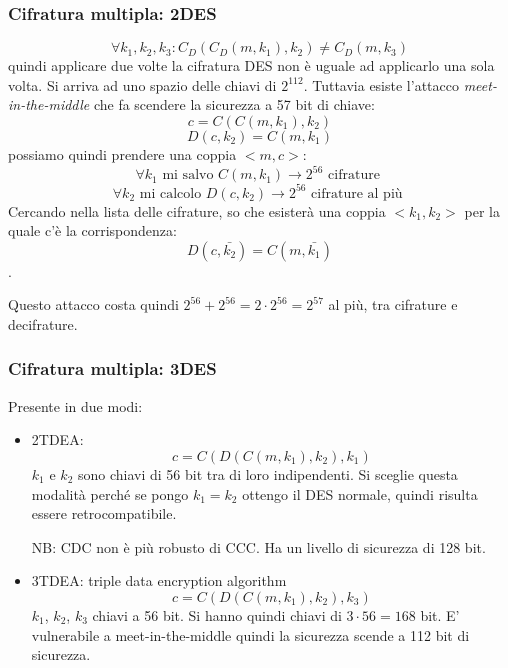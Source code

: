 \subsubsection{Cifratura multipla: 2DES}
$$ \forall k_1, k_2, k_3: C_D(C_D(m, k_1), k_2) \neq C_D(m, k_3) $$
quindi applicare due volte la cifratura DES non è uguale ad applicarlo una sola volta.
Si arriva ad uno spazio delle chiavi di $2^{112}$.
Tuttavia esiste l'attacco \emph{meet-in-the-middle} che fa scendere la sicurezza a 57 bit di chiave:
$$ c = C(C(m,k_1), k_2) $$
$$ D(c,k_2) = C(m,k_1) $$
possiamo quindi prendere una coppia $<m, c>$:
$$ \forall k_1 \text{ mi salvo } C(m, k_1) \xrightarrow{} 2^{56} \text{ cifrature }$$
$$ \forall k_2 \text{ mi calcolo } D(c, k_2) \xrightarrow{} 2^{56} \text{ cifrature al più }$$
Cercando nella lista delle cifrature, so che esisterà una coppia $<k_1, k_2>$ per la quale c'è la corrispondenza:
$$ D(c, \bar{k_2}) = C(m, \bar{k_1}) $$.

Questo attacco costa quindi $2^{56} + 2^{56} = 2 \cdot 2^{56} = 2^{57}$ al più, tra cifrature e decifrature.

\subsubsection{Cifratura multipla: 3DES}
Presente in due modi:
\begin{itemize}
    \item 2TDEA:
        $$ c = C(D(C(m, k_1), k_2), k_1) $$
        $k_1$ e $k_2$ sono chiavi di 56 bit tra di loro indipendenti. Si sceglie questa modalità perché se pongo $k_1 = k_2$ ottengo il DES normale, quindi risulta essere retrocompatibile.
        
        NB: CDC non è più robusto di CCC. Ha un livello di sicurezza di 128 bit.
    \item 3TDEA: triple data encryption algorithm
        $$ c = C(D(C(m, k_1), k_2), k_3) $$
        $k_1$, $k_2$, $k_3$ chiavi a 56 bit. Si hanno quindi chiavi di $3 \cdot 56 = 168$ bit. E' vulnerabile a meet-in-the-middle quindi la sicurezza scende a 112 bit di sicurezza.
\end{itemize}